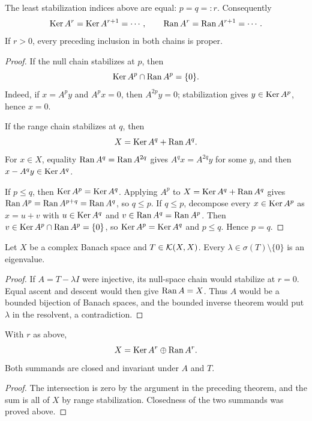 \begin{notetheorem}
The least stabilization indices above are equal: $p=q=:r$.  Consequently
\[
  \operatorname{Ker} A^r=\operatorname{Ker} A^{r+1}=\cdots,
  \qquad
  \operatorname{Ran} A^r=\operatorname{Ran} A^{r+1}=\cdots.
\]
If $r>0$, every preceding inclusion in both chains is proper.
\end{notetheorem}

\begin{proof}
If the null chain stabilizes at $p$, then
\[
  \operatorname{Ker} A^p\cap\operatorname{Ran} A^p=\{0\}.
\]
Indeed, if $x=A^py$ and $A^px=0$, then $A^{2p}y=0$; stabilization gives
$y\in\operatorname{Ker} A^p$, hence $x=0$.

If the range chain stabilizes at $q$, then
\[
  X=\operatorname{Ker} A^q+\operatorname{Ran} A^q.
\]
For $x\in X$, equality $\operatorname{Ran} A^q=\operatorname{Ran} A^{2q}$ gives
$A^qx=A^{2q}y$ for some $y$, and then
$x-A^qy\in\operatorname{Ker} A^q$.

If $p\le q$, then $\operatorname{Ker} A^p=\operatorname{Ker} A^q$.  Applying $A^p$ to
$X=\operatorname{Ker} A^q+\operatorname{Ran} A^q$ gives
$\operatorname{Ran} A^p=\operatorname{Ran} A^{p+q}=\operatorname{Ran} A^q$, so $q\le p$.  If $q\le p$, decompose every
$x\in\operatorname{Ker} A^p$ as $x=u+v$ with $u\in\operatorname{Ker} A^q$ and
$v\in\operatorname{Ran} A^q=\operatorname{Ran} A^p$.  Then
$v\in\operatorname{Ker} A^p\cap\operatorname{Ran} A^p=\{0\}$, so
$\operatorname{Ker} A^p=\operatorname{Ker} A^q$ and $p\le q$.  Hence $p=q$.
\end{proof}

\begin{notetheorem}
Let $X$ be a complex Banach space and $T\in\mathcal{K}(X,X)$.  Every
$\lambda\in\sigma(T)\setminus\{0\}$ is an eigenvalue.
\end{notetheorem}

\begin{proof}
If $A=T-\lambda I$ were injective, its null-space chain would stabilize at
$r=0$.  Equal ascent and descent would then give
$\operatorname{Ran} A=X$.  Thus $A$ would be a bounded bijection of Banach spaces, and the
bounded inverse theorem would put $\lambda$ in the resolvent, a contradiction.
\end{proof}

\begin{notetheorem}
With $r$ as above,
\[
  X=\operatorname{Ker} A^r\oplus\operatorname{Ran} A^r.
\]
Both summands are closed and invariant under $A$ and $T$.
\end{notetheorem}

\begin{proof}
The intersection is zero by the argument in the preceding theorem, and the
sum is all of $X$ by range stabilization.  Closedness of the two summands was
proved above.
\end{proof}


